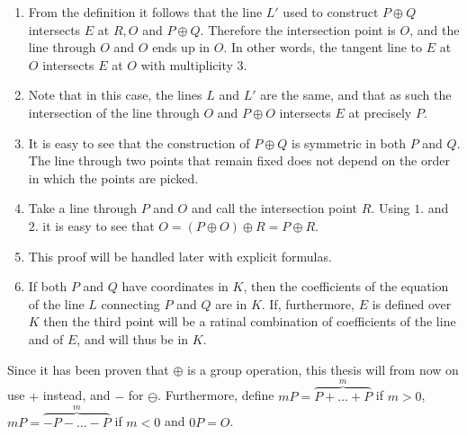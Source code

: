 \begin{prf}
	\begin{enumerate}
		\item From the definition it follows that the line $L'$ used to construct $P\oplus Q$ intersects $E$ at $R,O$ and $P\oplus Q$. Therefore the intersection point is $O$, and the line through $O$ and $O$ ends up in $O$. In other words, the tangent line to $E$ at $O$ intersects $E$ at $O$ with multiplicity 3.
		\item Note that in this case, the lines $L$ and $L'$ are the same, and that as such the intersection of the line through $O$ and $P\oplus O$ intersects $E$ at precisely $P$.
		\item It is easy to see that the construction of $P\oplus Q$ is symmetric in both $P$ and $Q$. The line through two points that remain fixed does not depend on the order in which the points are picked.
		\item Take a line through $P$ and $O$ and call the intersection point $R$. Using $1.$ and $2.$ it is easy to see that $O=(P\oplus O)\oplus R=P\oplus R.$
		\item This proof will be handled later with explicit formulas.
		\item If both $P$ and $Q$ have coordinates in $K$, then the coefficients of the equation of the line $L$ connecting $P$ and $Q$ are in $K$. If, furthermore, $E$ is defined over $K$ then the third point will be a ratinal combination of coefficients of the line and of $E$, and will thus be in $K$.
	\end{enumerate}
\end{prf}
\begin{rem}
	Since it has been proven that $\oplus$ is a group operation, this thesis will from now on use $+$ instead, and $-$ for $\ominus$. Furthermore, define $mP=\overbrace{P+\dots+P}^m$ if $m>0$, $mP=\overbrace{-P-\dots-P}^m$ if $m<0$ and $0P=O$.
\end{rem}

